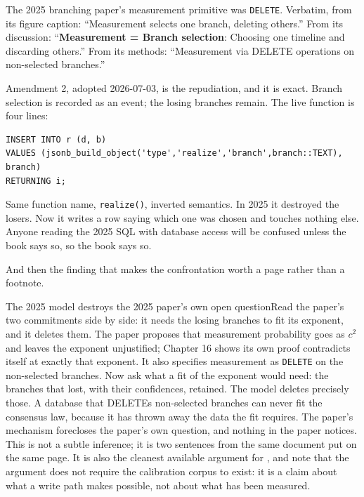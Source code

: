 The 2025 branching paper's measurement primitive was \texttt{DELETE}. Verbatim, from its figure caption: ``Measurement selects one branch, deleting others.'' From its discussion: ``\textbf{Measurement = Branch selection}: Choosing one timeline and discarding others.'' From its methods: ``Measurement via DELETE operations on non-selected branches.''

Amendment 2, adopted 2026-07-03, is the repudiation, and it is exact. Branch selection is recorded as an event; the losing branches remain. The live function is four lines:

\begin{verbatim}
INSERT INTO r (d, b)
VALUES (jsonb_build_object('type','realize','branch',branch::TEXT), branch)
RETURNING i;
\end{verbatim}

Same function name, \texttt{realize()}, inverted semantics. In 2025 it destroyed the losers. Now it writes a row saying which one was chosen and touches nothing else. Anyone reading the 2025 SQL with database access will be confused unless the book says so, so the book says so.

And then the finding that makes the confrontation worth a page rather than a footnote.

\begin{Correspondence}{The 2025 model destroys the 2025 paper's own open question}{Read the paper's two commitments side by side: it needs the losing branches to fit its exponent, and it deletes them.}
The paper proposes that measurement probability goes as $c^2$ and leaves the exponent unjustified; Chapter 16 shows its own proof contradicts itself at exactly that exponent. It also specifies measurement as \texttt{DELETE} on the non-selected branches. Now ask what a fit of the exponent would need: the branches that lost, with their confidences, retained. The model deletes precisely those.
A database that DELETEs non-selected branches can never fit the consensus law, because it has thrown away the data the fit requires. The paper's mechanism forecloses the paper's own question, and nothing in the paper notices. This is not a subtle inference; it is two sentences from the same document put on the same page. It is also the cleanest available argument for , and note that the argument does not require the calibration corpus to exist: it is a claim about what a write path makes possible, not about what has been measured.
\end{Correspondence}

